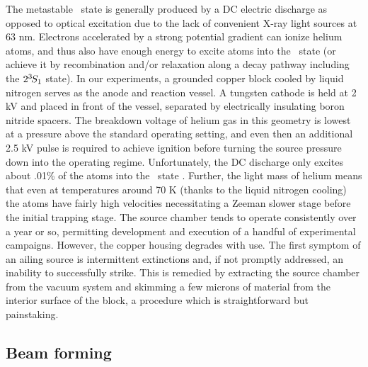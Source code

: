 	The metastable \mhe~state is generally produced by a DC electric discharge as opposed to optical excitation due to the lack of convenient X-ray light sources at 63 nm.
	Electrons accelerated by a strong potential gradient can ionize helium atoms, and thus also have enough energy to excite atoms into the \mhe~state (or achieve it by recombination and/or relaxation along a decay pathway including the $2^{3\!}S_1$ state).
	In our experiments, a grounded copper block cooled by liquid nitrogen serves as the anode and reaction vessel.
	A tungsten cathode is held at 2 kV and placed in front of the vessel, separated by electrically insulating boron nitride spacers.
	The breakdown voltage of helium gas in this geometry is lowest at a pressure above the standard operating setting, and even then an additional 2.5 kV pulse is required to achieve ignition before turning the source pressure down into the operating regime.
	Unfortunately, the DC discharge only excites about .01\% of the atoms into the \mhe~state \cite{Stas06}.
	Further, the light mass of helium means that even at temperatures around 70 K (thanks to the liquid nitrogen cooling) the atoms have fairly high velocities necessitating a Zeeman slower stage before the initial trapping stage. 
	The source chamber tends to operate consistently over a year or so, permitting development and execution of a handful of experimental campaigns.
	However, the copper housing degrades with use.
	The first symptom of an ailing source is intermittent extinctions and, if not promptly addressed, an inability to successfully strike.
	This is remedied by extracting the source chamber from the vacuum system and skimming a few microns of material from the interior surface of the block, a procedure which is  straightforward but painstaking.
	

\subsection*{Beam forming}

